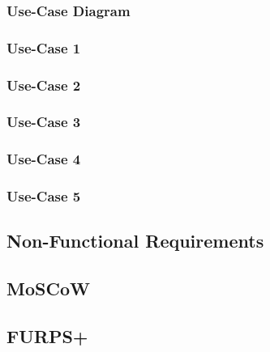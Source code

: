 \subsubsection{Use-Case Diagram}


\subsubsection{Use-Case 1}


\subsubsection{Use-Case 2}


\subsubsection{Use-Case 3}


\subsubsection{Use-Case 4}


\subsubsection{Use-Case 5}


\subsection{Non-Functional Requirements}


\subsection{MoSCoW}


\subsection{FURPS+}


